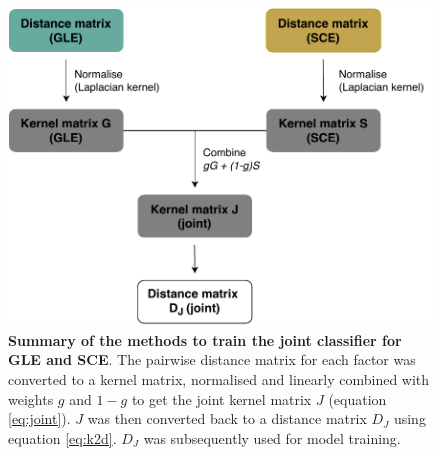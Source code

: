 \begin{figure}[h!]
    \centering
    \includegraphics[scale=0.8]{graphics/joint_classifier.pdf}
    \caption{\textbf{Summary of the methods to train the joint classifier for GLE and SCE}. The pairwise distance matrix for each factor was converted to a kernel matrix, normalised and linearly combined with weights $g$ and $1-g$ to get the joint kernel matrix $J$ (equation \ref{eq:joint}). $J$ was then converted back to a distance matrix $D_J$ using equation \ref{eq:k2d}. $D_J$ was subsequently used for model training.}
    \label{fig:joint}
\end{figure}
